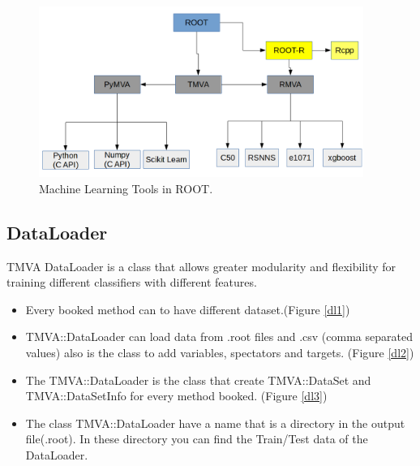 \documentclass[a4paper]{jpconf}
\begin{document}
\begin{figure}[h]
\centering
\includegraphics[width=25pc]{img/tmva.png}\caption{\label{tmva:label} Machine Learning Tools in ROOT.}
\end{figure}


\subsection{DataLoader}

TMVA DataLoader is a class that allows greater
modularity and flexibility for training different classifiers
with different features.

\begin{itemize}  
\item Every booked method can to have different dataset.(Figure \ref{dl1})
\item TMVA::DataLoader can load data from .root files and .csv (comma separated values) also is the class to add variables, spectators and targets. (Figure \ref{dl2})
\item The TMVA::DataLoader is the class that create TMVA::DataSet and TMVA::DataSetInfo for every method booked. (Figure \ref{dl3})
\item The class TMVA::DataLoader have a name that is a directory in the output file(.root). In these directory you can find the Train/Test data of the DataLoader.
\end{itemize}
\end{document}
